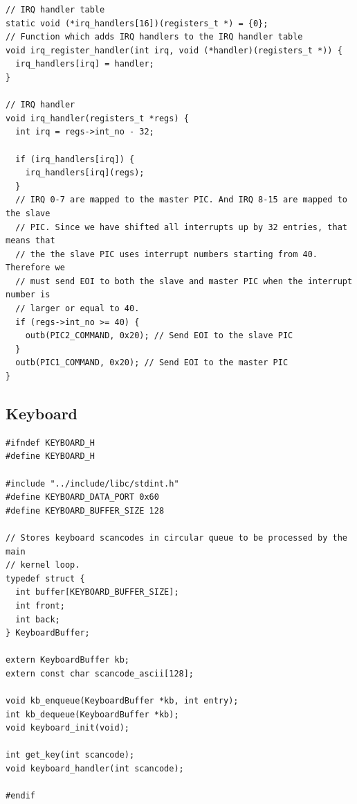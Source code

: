 \documentclass[../main.tex]{subfiles}
\begin{document}
\begin{verbatim}
// IRQ handler table
static void (*irq_handlers[16])(registers_t *) = {0};
// Function which adds IRQ handlers to the IRQ handler table
void irq_register_handler(int irq, void (*handler)(registers_t *)) {
  irq_handlers[irq] = handler;
}

// IRQ handler
void irq_handler(registers_t *regs) {
  int irq = regs->int_no - 32;

  if (irq_handlers[irq]) {
    irq_handlers[irq](regs);
  }
  // IRQ 0-7 are mapped to the master PIC. And IRQ 8-15 are mapped to the slave
  // PIC. Since we have shifted all interrupts up by 32 entries, that means that
  // the the slave PIC uses interrupt numbers starting from 40. Therefore we
  // must send EOI to both the slave and master PIC when the interrupt number is
  // larger or equal to 40.
  if (regs->int_no >= 40) {
    outb(PIC2_COMMAND, 0x20); // Send EOI to the slave PIC
  }
  outb(PIC1_COMMAND, 0x20); // Send EOI to the master PIC
}

\end{verbatim}


\subsection{Keyboard}
\label{apx:keyboard}


\label{lst:keyboard_h}
\begin{verbatim}
#ifndef KEYBOARD_H
#define KEYBOARD_H

#include "../include/libc/stdint.h"
#define KEYBOARD_DATA_PORT 0x60
#define KEYBOARD_BUFFER_SIZE 128

// Stores keyboard scancodes in circular queue to be processed by the main
// kernel loop.
typedef struct {
  int buffer[KEYBOARD_BUFFER_SIZE];
  int front;
  int back;
} KeyboardBuffer;

extern KeyboardBuffer kb;
extern const char scancode_ascii[128];

void kb_enqueue(KeyboardBuffer *kb, int entry);
int kb_dequeue(KeyboardBuffer *kb);
void keyboard_init(void);

int get_key(int scancode);
void keyboard_handler(int scancode);

#endif

\end{verbatim}
\end{document}

